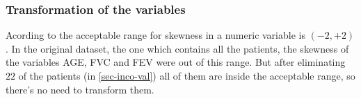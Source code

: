 \subsubsection{Transformation of the variables} \label{sec-var-trans}
Acording to  the acceptable range for skewness in a numeric
variable is $(-2, +2)$. In the original dataset, the one which contains all the patients, the skewness of the variables AGE, FVC and FEV were out of this range. But after eliminating $22$ of the patients (in \ref{sec-inco-val}) all of them are inside the acceptable range, so there's no need to transform them.

%
%








%

